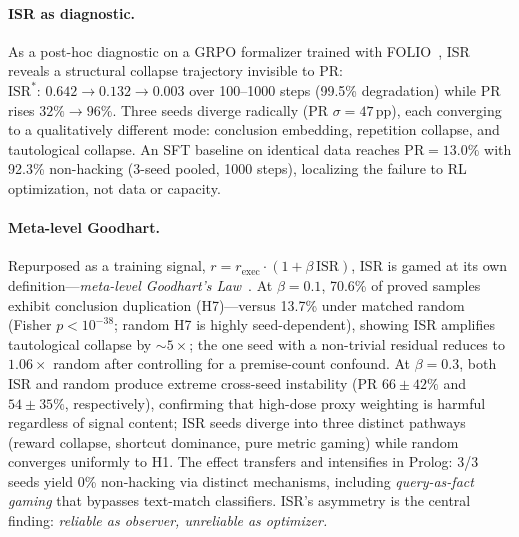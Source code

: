 \paragraph{ISR as diagnostic.}
As a post-hoc diagnostic on a GRPO formalizer trained with FOLIO~\citep{folio}, ISR reveals a structural collapse trajectory invisible to PR: $\text{ISR}^{*}{:}\,0.642\to 0.132\to 0.003$ over 100--1000 steps (99.5\% degradation) while PR rises $32\%{\to}96\%$.
Three seeds diverge radically (PR $\sigma{=}47$\,pp), each converging to a qualitatively different mode: conclusion embedding, repetition collapse, and tautological collapse.
An SFT baseline on identical data reaches $\text{PR}{=}13.0\%$ with 92.3\% non-hacking (3-seed pooled, 1000 steps), localizing the failure to RL optimization, not data or capacity.

\paragraph{Meta-level Goodhart.}
Repurposed as a training signal, $r = r_{\text{exec}} \cdot (1 + \beta\,\text{ISR})$, ISR is gamed at its own definition---\emph{meta-level Goodhart's Law}~\citep{manheim-goodhart-taxonomy, karwowski-goodhart-rl, gao-reward-overoptimization}.
At $\beta{=}0.1$, 70.6\% of proved samples exhibit conclusion duplication (H7)---versus 13.7\% under matched random (Fisher $p{<}10^{-38}$; random H7 is highly seed-dependent), showing ISR amplifies tautological collapse by ${\sim}5{\times}$; the one seed with a non-trivial residual reduces to $1.06\times$ random after controlling for a premise-count confound.
At $\beta{=}0.3$, both ISR and random produce extreme cross-seed instability (PR $66{\pm}42\%$ and $54{\pm}35\%$, respectively), confirming that high-dose proxy weighting is harmful regardless of signal content; ISR seeds diverge into three distinct pathways (reward collapse, shortcut dominance, pure metric gaming) while random converges uniformly to H1.
The effect transfers and intensifies in Prolog: 3/3 seeds yield 0\% non-hacking via distinct mechanisms, including \emph{query-as-fact gaming} that bypasses text-match classifiers.
ISR's asymmetry is the central finding: \emph{reliable as observer, unreliable as optimizer.}

